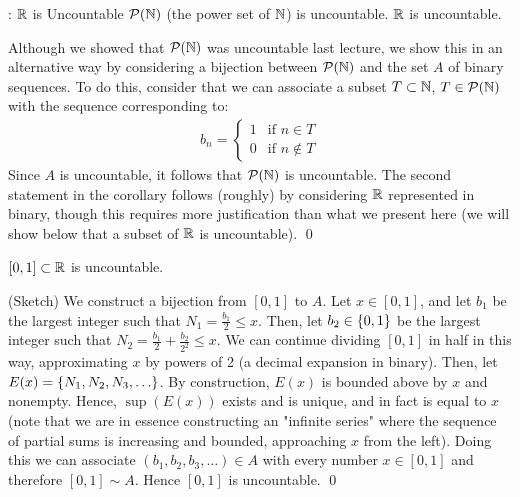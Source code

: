 \begin{ncorollary}{: $\mathbb{R}$ is Uncountable}{}
    $\mathcal{P}(\mathbb{N})$ (the power set of $\mathbb{N}$) is uncountable. $\mathbb{R}$ is uncountable.
\end{ncorollary}
\begin{nproof}
    Although we showed that $\mathcal{P}(\mathbb{N})$ was uncountable last lecture, we show this in an alternative way by considering a bijection between $\mathcal{P}(\mathbb{N})$ and the set $A$ of binary sequences. To do this, consider that we can associate a subset $T \subset \mathbb{N}$, $T \in \mathcal{P}(\mathbb{N})$ with the sequence corresponding to:
    \begin{align*}
        b_n = \begin{cases}
            1 & \text{if $n \in T$}
            \\ 0 & \text{if $n \notin T$}
        \end{cases}
    \end{align*}
    Since $A$ is uncountable, it follows that $\mathcal{P}(\mathbb{N})$ is uncountable. The second statement in the corollary follows (roughly) by considering $\mathbb{R}$ represented in binary, though this requires more justification than what we present here (we will show below that a subset of $\mathbb{R}$ is uncountable). \qed
\end{nproof}
\begin{ntheorem}{}{}
    $[0, 1] \subset \mathbb{R}$ is uncountable.
\end{ntheorem}
\begin{nproof}
    (Sketch) We construct a bijection from $[0, 1]$ to $A$. Let $x \in [0,1]$, and let $b_1$ be the largest integer such that $N_1 = \frac{b_1}{2} \leq x$. Then, let $b_2 \in \set{0, 1}$ be the largest integer such that $N_2 = \frac{b_1}{2} + \frac{b_2}{2^2} \leq x$. We can continue dividing $[0,1]$ in half in this way, approximating $x$ by powers of 2 (a decimal expansion in binary). Then, let $E(x) = \set{N_1, N_2, N_3, \ldots}$. By construction, $E(x)$ is bounded above by $x$ and nonempty. Hence, $\sup(E(x))$ exists and is unique, and in fact is equal to $x$ (note that we are in essence constructing an "infinite series" where the sequence of partial sums is increasing and bounded, approaching $x$ from the left). Doing this we can associate $(b_1, b_2, b_3, \ldots) \in A$ with every number $x \in [0, 1]$ and therefore $[0, 1] \sim A$. Hence $[0, 1]$ is uncountable. \qed
\end{nproof}

